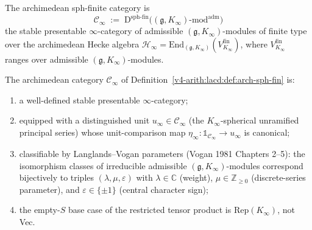 \begin{definition}
\label{v4-arith:lacd:def:arch-sph-fin}
The archimedean sph-finite category is
\begin{equation}
\mathcal{C}_{\infty} \;:=\; \mathrm{D}^{\mathrm{sph\text{-}fin}}
\bigl((\mathfrak{g}, K_{\infty})\text{-mod}^{\mathrm{adm}}\bigr)
\end{equation}
the stable presentable \(\infty\)-category of admissible
\((\mathfrak{g}, K_{\infty})\)-modules of finite type over the
archimedean Hecke algebra
\(\mathcal{H}_{\infty} = \mathrm{End}_{(\mathfrak{g}, K_{\infty})}
(V_{K_{\infty}}^{\mathrm{fin}})\), where \(V_{K_{\infty}}^{\mathrm{fin}}\)
ranges over admissible \((\mathfrak{g}, K_{\infty})\)-modules.
\end{definition}

\begin{theorem}
\label{v4-arith:lacd:thm:L0-closed}
The archimedean category \(\mathcal{C}_{\infty}\)
of Definition~\ref{v4-arith:lacd:def:arch-sph-fin} is:
\begin{enumerate}
\item a well-defined stable presentable \(\infty\)-category;
\item equipped with a distinguished unit
\(u_{\infty} \in \mathcal{C}_{\infty}\) (the \(K_{\infty}\)-spherical
unramified principal series) whose unit-comparison map
\(\eta_{\infty}: \mathbb{1}_{\mathcal{C}_{\infty}} \to u_{\infty}\)
is canonical;
\item classifiable by Langlands--Vogan parameters (Vogan 1981
Chapters 2--5): the isomorphism classes of irreducible admissible
\((\mathfrak{g}, K_{\infty})\)-modules correspond bijectively to
triples \((\lambda, \mu, \varepsilon)\) with \(\lambda \in \mathbb{C}\)
(weight), \(\mu \in \mathbb{Z}_{\geq 0}\) (discrete-series parameter),
and \(\varepsilon \in \{\pm 1\}\) (central character sign);
\item the empty-\(S\) base case of the restricted tensor product is
\(\mathrm{Rep}(K_{\infty})\), not Vec.
\end{enumerate}
\end{theorem}

